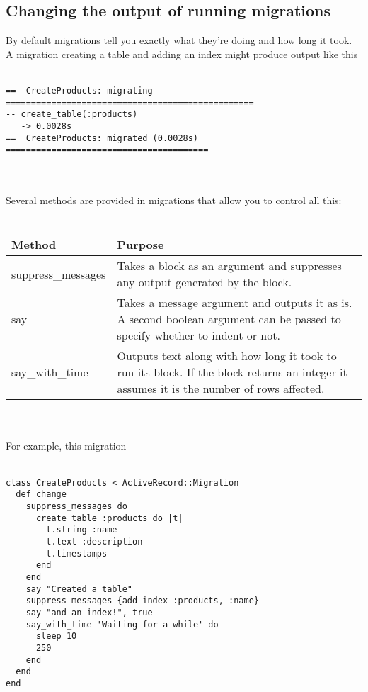 \documentclass[10pt]{book}
\begin{document}
\subsection{ Changing the output of running migrations}

By default migrations tell you exactly what they’re doing and how long it took. A migration creating a table and adding an index might produce output like this
\\ \\
\begin{minipage}{\textwidth}
\begin{verbatim}
==  CreateProducts: migrating =================================================
-- create_table(:products)
   -> 0.0028s
==  CreateProducts: migrated (0.0028s) ========================================
\end{verbatim}
\end{minipage}
\\ \\

Several methods are provided in migrations that allow you to control all this:
\\ \\
\begin{tabular}{l|p{}}
\hline
\textbf{Method             } & \textbf{Purpose} \\ 
\hline
suppress\_messages     & Takes a block as an argument and suppresses any output                        generated by the block. \\ 
say                   & Takes a message argument and outputs it as is. A second                        boolean argument can be passed to specify whether to                        indent or not. \\ 
say\_with\_time         & Outputs text along with how long it took to run its                        block. If the block returns an integer it assumes it                        is the number of rows affected.
\end{tabular}
\\ \\


For example, this migration
\\ \\
\begin{minipage}{\textwidth}
\begin{verbatim}
class CreateProducts < ActiveRecord::Migration
  def change
    suppress_messages do
      create_table :products do |t|
        t.string :name
        t.text :description
        t.timestamps
      end
    end
    say "Created a table"
    suppress_messages {add_index :products, :name}
    say "and an index!", true
    say_with_time 'Waiting for a while' do
      sleep 10
      250
    end
  end
end
\end{verbatim}
\end{minipage}
\\ \\
\end{document}
